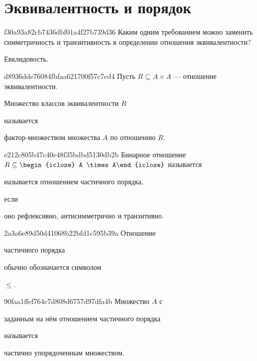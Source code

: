 


\section{Эквивалентность и порядок}
\begin{note}{f30a93a82cb7436dbf01a4f27b739d36}
    Каким одним требованием можно заменить симметричность и транзитивность в определении отношения эквивалентности?

    \begin{cloze}{1}
        Евклидовость.
    \end{cloze}
\end{note}

\begin{note}{d8936dde76084fbfaa621700f57c7cd4}
    Пусть \({ R \subseteq A \times A }\) --- отношение эквивалентности.
    \begin{icloze}{2}Множество классов эквивалентности \({ R }\)\end{icloze} называется \begin{icloze}{1}фактор-множеством множества \({ A }\) по отношению \({ R }\).\end{icloze}
\end{note}

\begin{note}{e212c805b47c40c48f35bdbd5130db2b}
    Бинарное отношение \({ R \subseteq \begin{icloze}{3}A \times A\end{icloze} }\) называется \begin{icloze}{2}называется отношением частичного порядка,\end{icloze} если \begin{icloze}{1}оно рефлексивно, антисимметрично и транзитивно.\end{icloze}
\end{note}

\begin{note}{2a3a6e89d50d41068b22bfd1c595b39a}
    Отношение \begin{icloze}{2}частичного порядка\end{icloze} обычно обозначается символом \begin{icloze}{1}\({ \leqslant }\).\end{icloze}
\end{note}

\begin{note}{90faa1ffef764c7d808d6757d97dfa4b}
    Множество \({ A }\) с \begin{icloze}{2}заданным на нём отношением частичного порядка\end{icloze} называется \begin{icloze}{1}частично упорядоченным множеством.\end{icloze}
\end{note}

